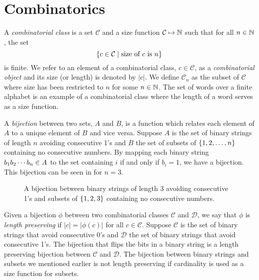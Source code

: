 \label{ch:backgr}
\section{Combinatorics\label{sec:combinatorics}}
A \emph{combinatorial class} is a set $\mathcal{C}$ and a size function $\mathcal{C} \mapsto \mathbb{N}$ such that for all $n\in\mathbb{N}$, the set
\[
    \left\{c \in \mathcal{C} \mid \text{size of $c$ is $n$}\right\}
\]
is finite. We refer to an element of a combinatorial class, $c\in\mathcal{C}$, as a \emph{combinatorial object} and its size (or length) is denoted by $|c|$. We define $\mathcal{C}_n$ as the subset of $\mathcal{C}$ where size has been restricted to $n$ for some $n\in\mathbb{N}$. The set of words over a finite alphabet is an example of a combinatorial class where the length of a word serves as a size function.

A \emph{bijection} between two sets, $A$ and $B$, is a function which relates each element of $A$ to a unique element of $B$ and vice versa. Suppose $A$ is the set of binary strings of length $n$ avoiding consecutive 1's and $B$ the set of subsets of $\left\{1,2,\dotsc,n\right\}$ containing no consecutive numbers. By mapping each binary string $b_1 b_2 \dotsm b_{n} \in A$ to the set containing $i$ if and only if $b_i=1$, we have a bijection. This bijection can be seen in  for $n=3$.

\begin{figure}[ht!]
    \centering
    
    \caption{A bijection between binary strings of length 3 avoiding consecutive 1's and subsets of $\left\{1,2,3\right\}$ containing no consecutive numbers.}
    \label{fig:bijection_example}
\end{figure}

Given a bijection $\phi$ between two combinatorial classes $\mathcal{C}$ and $\mathcal{D}$, we say that $\phi$ is \emph{length preserving} if $|c| = |\phi(c)|$ for all $c\in\mathcal{C}$. Suppose $\mathcal{C}$ is the set of binary strings that avoid consecutive 0's and $\mathcal{D}$ the set of binary strings that avoid consecutive 1's. The bijection that flips the bits in a binary string is a length preserving bijection between $\mathcal{C}$ and $\mathcal{D}$. The bijection between binary strings and subsets we mentioned earlier is not length preserving if cardinality is used as a size function for subsets.


